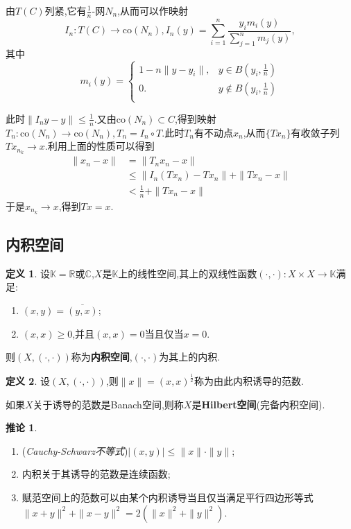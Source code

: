 \documentclass{ctexart}
\theoremstyle{definition}
\newtheorem{definition}{定义}
\newtheorem{corollary}{推论}
\theoremstyle{remark}
\newenvironment{proofsketch}{
  \renewcommand{\proofname}{证明概要}\proof}{\endproof}
\begin{document}
	\begin{proofsketch}
		由$T(C)$列紧,它有$\frac{1}{n}$-网$N_n$,从而可以作映射
		$$I_n:T(C)\to\mathrm{co}(N_n),I_n(y)=\sum_{i=1}^n\frac{y_im_i(y)}{\sum_{j=1}^n{m_j(y)}},$$
		其中
		\begin{equation*}
			m_i(y)=
			\begin{cases}
				1-n\|y-y_i\|, & y\in B(y_i,\frac{1}{n}) \\
				0. & y\notin B(y_i,\frac{1}{n}) \\
			\end{cases}
		\end{equation*}
		
		此时$\|I_ny-y\|\le\frac{1}{n}$.又由$\mathrm{co}(N_n)\subset C$,得到映射$T_n:\mathrm{co}(N_n)\to\mathrm{co}(N_n),T_n=I_n\circ T$.此时$T_n$有不动点$x_n$,从而$\{Tx_n\}$有收敛子列$Tx_{n_k}\to x$.利用上面的性质可以得到
		\begin{align*}
			\|x_n-x\| & =\|T_nx_n-x\| \\
			& \le \|I_n(Tx_n)-Tx_n\|+\|Tx_n-x\| \\
			& < \frac{1}{n}+\|Tx_n-x\|
		\end{align*}
		于是$x_{n_k}\to x$,得到$Tx=x$.
	\end{proofsketch}
	
	\subsection{内积空间}
	
	\begin{definition}
		设$\mathbb{K}=\mathbb{R}\mbox{或}\mathbb{C}$,$X$是$\mathbb{K}$上的线性空间,其上的双线性函数$(\cdot,\cdot):X\times X\to\mathbb{K}$满足:
		\begin{enumerate}
			\item $(x,y)=\overline{(y,x)}$;
			\item $(x,x)\ge 0$,并且$(x,x)=0$当且仅当$x=0$.
		\end{enumerate}
		则$(X,(\cdot,\cdot))$称为\textbf{内积空间},$(\cdot,\cdot)$为其上的内积.
	\end{definition}
	\begin{definition}
		设$(X,(\cdot,\cdot))$,则$\|x\|=(x,x)^\frac{1}{2}$称为由此内积诱导的范数.
		
		如果$X$关于诱导的范数是Banach空间,则称$X$是\textbf{Hilbert空间}(完备内积空间).
	\end{definition}
	\begin{corollary}
		\begin{enumerate}
			\item (\textit{Cauchy-Schwarz不等式})$|(x,y)|\le\|x\|\cdot\|y\|$;
			\item 内积关于其诱导的范数是连续函数;
			\item 赋范空间上的范数可以由某个内积诱导当且仅当满足平行四边形等式$\|x+y\|^2+\|x-y\|^2=2(\|x\|^2+\|y\|^2)$.
		\end{enumerate}
	\end{corollary}
	
\end{document}
